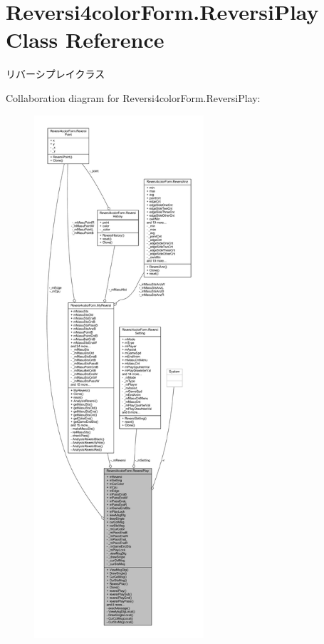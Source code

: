 \hypertarget{class_reversi4color_form_1_1_reversi_play}{}\section{Reversi4color\+Form.\+Reversi\+Play Class Reference}
\label{class_reversi4color_form_1_1_reversi_play}


リバーシプレイクラス  




Collaboration diagram for Reversi4color\+Form.\+Reversi\+Play\+:
\nopagebreak
\begin{figure}[H]
\begin{center}
\leavevmode
\includegraphics[height=550pt]{class_reversi4color_form_1_1_reversi_play__coll__graph}
\end{center}
\end{figure}
